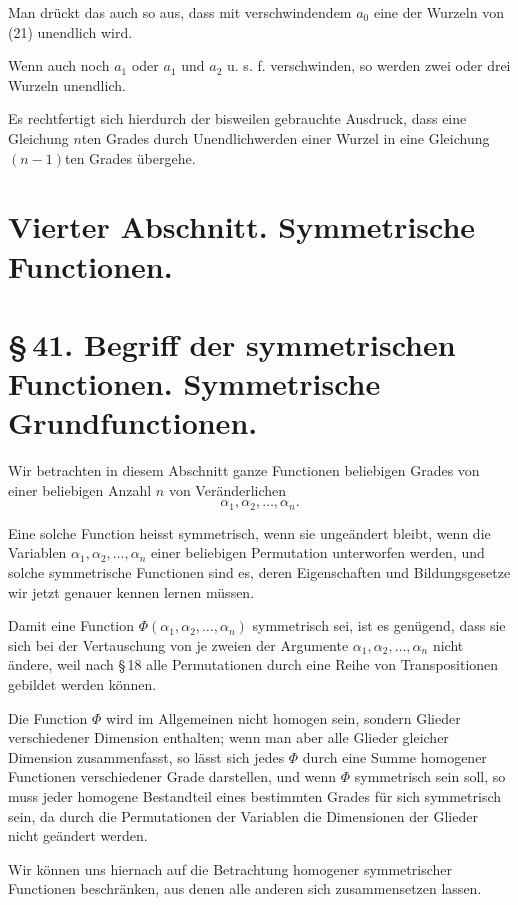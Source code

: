 \documentclass[11pt]{article}
\begin{document}
Man drückt das auch so aus, dass mit verschwindendem $a_0$ eine der Wurzeln von (21) unendlich wird.

Wenn auch noch $a_1$ oder $a_1$ und $a_2$ u. s. f. verschwinden, so werden zwei oder drei Wurzeln unendlich.

Es rechtfertigt sich hierdurch der bisweilen gebrauchte Ausdruck, dass eine Gleichung $n$ten Grades durch Unendlichwerden einer Wurzel in eine Gleichung $(n-1)$ten Grades übergehe.

\section*{Vierter Abschnitt. Symmetrische Functionen.}

\section*{\S\,41. Begriff der symmetrischen Functionen. Symmetrische Grundfunctionen.}

Wir betrachten in diesem Abschnitt ganze Functionen beliebigen Grades von einer beliebigen Anzahl $n$ von Veränderlichen
\[
 \alpha_1,\alpha_2,\ldots,\alpha_n.
\]

Eine solche Function heisst symmetrisch, wenn sie ungeändert bleibt, wenn die Variablen $\alpha_1,\alpha_2,\ldots,\alpha_n$ einer beliebigen Permutation unterworfen werden, und solche symmetrische Functionen sind es, deren Eigenschaften und Bildungsgesetze wir jetzt genauer kennen lernen müssen.

Damit eine Function $\Phi(\alpha_1,\alpha_2,\ldots,\alpha_n)$ symmetrisch sei, ist es genügend, dass sie sich bei der Vertauschung von je zweien der Argumente $\alpha_1,\alpha_2,\ldots,\alpha_n$ nicht ändere, weil nach \S\,18 alle Permutationen durch eine Reihe von Transpositionen gebildet werden können.

Die Function $\Phi$ wird im Allgemeinen nicht homogen sein, sondern Glieder verschiedener Dimension enthalten; wenn man aber alle Glieder gleicher Dimension zusammenfasst, so lässt sich jedes $\Phi$ durch eine Summe homogener Functionen verschiedener Grade darstellen, und wenn $\Phi$ symmetrisch sein soll, so muss jeder homogene Bestandteil eines bestimmten Grades für sich symmetrisch sein, da durch die Permutationen der Variablen die Dimensionen der Glieder nicht geändert werden.

Wir können uns hiernach auf die Betrachtung homogener symmetrischer Functionen beschränken, aus denen alle anderen sich zusammensetzen lassen.
\end{document}
